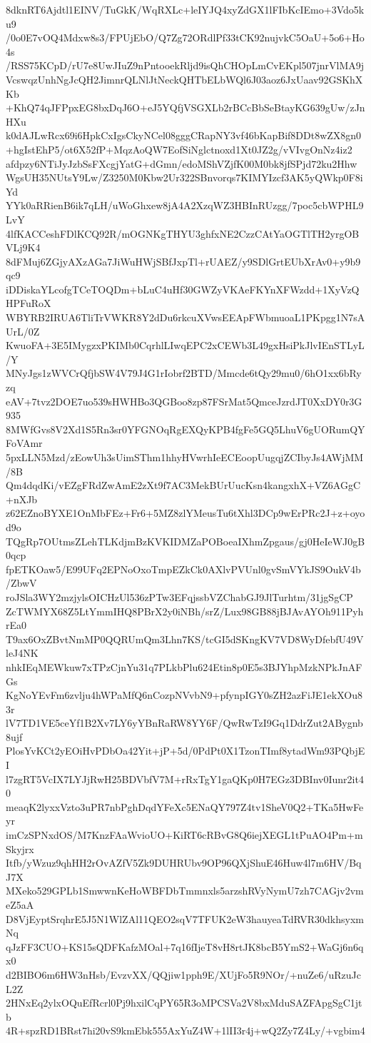 8dknRT6Ajdtl1EINV/TuGkK/WqRXLc+leIYJQ4xyZdGX1lFIbKcIEmo+3Vdo5ku9
/0o0E7vOQ4Mdxw8s3/FPUjEbO/Q7Zg72ORdlPf33tCK92nujvkC5OaU+5o6+Ho4s
/RSS75KCpD/rU7e8UwJIuZ9nPntooekRljd9isQhCHOpLmCvEKpl507jnrVlMA9j
VcswqzUnhNgJcQH2JimnrQLNlJtNeckQHTbELbWQl6J03aoz6JxUaav92GSKhXKb
+KhQ74qJFPpxEG8bxDqJ6O+eJ5YQfjVSGXLb2rBCcBbSeBtayKG639gUw/zJnHXu
k0dAJLwRcx69i6HpkCxIgsCkyNCel08gggCRapNY3vf46bKapBif8DDt8wZX8gn0
+hgIstEhP5/ot6X52fP+MqzAoQW7EofSiNglctnoxd1Xt0JZ2g/vVIvgOnNz4iz2
afdpzy6NTiJyJzbSsFXcgjYatG+dGmn/edoMShVZjfK00M0bk8jfSPjd72ku2Hhw
WgsUH35NUtsY9Lw/Z3250M0Kbw2Ur322SBnvorqs7KIMYIzcf3AK5yQWkp0F8iYd
YYk0aRRienB6ik7qLH/uWoGhxew8jA4A2XzqWZ3HBInRUzgg/7poc5cbWPHL9LvY
4lfKACCeshFDlKCQ92R/mOGNKgTHYU3ghfxNE2CzzCAtYaOGTlTH2yrgOBVLj9K4
8dFMuj6ZGjyAXzAGa7JiWuHWjSBfJxpTl+rUAEZ/y9SDlGrtEUbXrAv0+y9b9qc9
iDDiskaYLcofgTCeTOQDm+bLuC4uHf30GWZyVKAeFKYnXFWzdd+1XyVzQHPFuRoX
WBYRB2IRUA6TliTrVWKR8Y2dDu6rkcuXVwsEEApFWbmuoaL1PKpgg1N7sAUrL/0Z
KwuoFA+3E5IMygzxPKIMb0CqrhlLIwqEPC2xCEWb3L49gxHsiPkJlvIEnSTLyL/Y
MNyJgs1zWVCrQfjbSW4V79J4G1rIobrf2BTD/Mmcde6tQy29mu0/6hO1xx6bRyzq
eAV+7tvz2DOE7uo539sHWHBo3QGBoo8zp87FSrMat5QmceJzrdJT0XxDY0r3G935
8MWfGvs8V2Xd1S5Rn3sr0YFGNOqRgEXQyKPB4fgFe5GQ5LhuV6gUORumQYFoVAmr
5pxLLN5Mzd/zEowUh3sUimSThm1hhyHVwrhIeECEoopUugqjZCIbyJs4AWjMM/8B
Qm4dqdKi/vEZgFRdZwAmE2zXt9f7AC3MekBUrUucKsn4kangxhX+VZ6AGgC+nXJb
z62EZnoBYXE1OnMbFEz+Fr6+5MZ8zlYMeusTu6tXhl3DCp9wErPRc2J+z+oyod9o
TQgRp7OUtmsZLehTLKdjmBzKVKIDMZaPOBoeaIXhmZpgaus/gj0HeIeWJ0gB0qcp
fpETKOaw5/E99UFq2EPNoOxoTmpEZkCk0AXlvPVUnl0gvSmVYkJS9OukV4b/ZbwV
roJSla3WY2mzjylsOICHzUl536zPTw3EFqjssbVZChabGJ9JlTurhtm/31jgSgCP
ZcTWMYX68Z5LtYmmIHQ8PBrX2y0iNBh/srZ/Lux98GB88jBJAvAYOh911PyhrEa0
T9ax6OxZBvtNmMP0QQRUmQm3Lhn7KS/tcGI5dSKngKV7VD8WyDfebfU49VleJ4NK
nhkIEqMEWkuw7xTPzCjnYu31q7PLkbPlu624Etin8p0E5s3BJYhpMzkNPkJnAFGs
KgNoYEvFm6zvlju4hWPaMfQ6nCozpNVvbN9+pfynpIGY0sZH2azFiJE1ekXOu83r
lV7TD1VE5ceYf1B2Xv7LY6yYBnRaRW8YY6F/QwRwTzI9Gq1DdrZut2ABygnb8ujf
PlosYvKCt2yEOiHvPDbOa42Yit+jP+5d/0PdPt0X1TzonTImf8ytadWm93PQbjEI
l7zgRT5VcIX7LYJjRwH25BDVbfV7M+rRxTgY1gaQKp0H7EGz3DBInv0Iunr2it40
meaqK2lyxxVzto3uPR7nbPghDqdYFeXc5ENaQY797Z4tv1SheV0Q2+TKa5HwFeyr
imCzSPNxdOS/M7KnzFAaWvioUO+KiRT6cRBvG8Q6iejXEGL1tPuAO4Pm+mSkyjrx
Itfb/yWzuz9qhHH2rOvAZfV5Zk9DUHRUbv9OP96QXjShuE46Huw4l7m6HV/BqJ7X
MXeko529GPLb1SmwwnKeHoWBFDbTmmnxls5arzshRVyNymU7zh7CAGjv2vmeZ5aA
D8VjEyptSrqhrE5J5N1WlZAl11QEO2sqV7TFUK2eW3hauyeaTdRVR30dkhsyxmNq
qJzFF3CUO+KS15sQDFKafzMOal+7q16fIjeT8vH8rtJK8bcB5YmS2+WaGj6n6qx0
d2BIBO6m6HW3nHsb/EvzvXX/QQjiw1pph9E/XUjFo5R9NOr/+nuZe6/uRzuJcL2Z
2HNxEq2ylxOQuEfRcrl0Pj9hxilCqPY65R3oMPCSVa2V8bxMduSAZFApgSgC1jtb
4R+spzRD1BRst7hi20vS9kmEbk555AxYuZ4W+1lII3r4j+wQ2Zy7Z4Ly/+vgbim4
